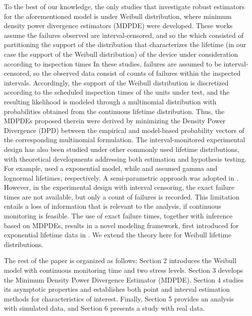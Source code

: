 \documentclass{article}
\begin{document}
To the best of our knowledge, the only studies that investigate robust estimators for the aforementioned model is under Weibull distribution\cite{balakrishnan2025}, where minimum density power divergence estimators (MDPDE) were developed. These works assume the failures observed are interval-censored, and so the which consisted of partitioning the support of the distribution that characterizes the lifetime (in our case the support of the Weibull distribution) of the device under consideration according to inspection times
In these studies, failures are assumed to be interval-censored, so the observed data consist of counts of failures within the inspected intervals. Accordingly, the support of the Weibull distribution is discretized according to the scheduled inspection times of the units under test, and the resulting likelihood is modeled through a multinomial distribution with probabilities obtained from the continuous lifetime distribution. Thus, the MDPDEs proposed therein were derived by minimizing the Density Power Divergence (DPD) between the empirical and model-based probability vectors of the corresponding multinomial formulation.
The interval-monitored experimental design has also been studied under other commonly used lifetime distributions, with theoretical developments addressing both estimation and hypothesis testing. For example, \cite{balakrishnan2023a,balakrishnan2023b, balakrishnan2023c}  used a exponential model, while \cite{balakrishnan2024b} and  \cite{balakrishnan2024a} assumed gamma and lognormal lifetimes, respectively. A semi-parametric approach was adopted in \cite{balakrishnan2023d}.
%
 However, in the experimental design with interval censoring, the exact failure times are not available, but only a count of failures is recorded. This limitation entails a loss of information that is relevant to the analysis, if continuous monitoring is feasible.
The use of exact failure times, together with inference based on MDPDEs, results in a novel modeling framework, first introduced for exponential lifetime data in \cite{jaenada2025}. We extend the theory here for Weibull lifetime distributions.

The rest of the paper is organized as follows: 
 Section 2 introduces the Weibull model with continuous monitoring time and two stress levels. Section 3 develops the Minimum Density Power Divergence Estimator (MDPDE). Section 4 studies its asymptotic properties and establishes both point and interval estimation methods for characteristics of interest. Finally, Section 5 provides an analysis with simulated data, and Section 6 presents a study with real data.
\end{document}
